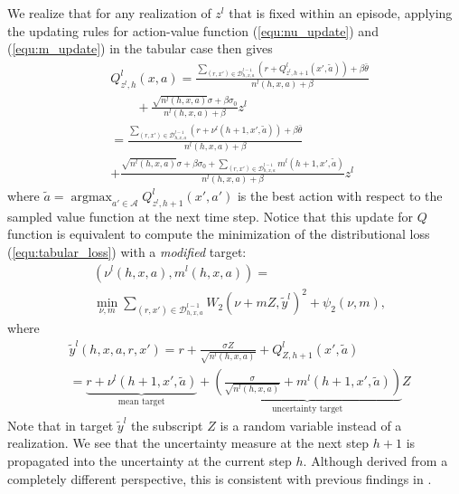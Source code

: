 \documentclass[letterpaper]{article} %
\newcommand{\Sp}[1]{\left(#1\right)}
\DeclareMathOperator*{\argmax}{argmax}
\theoremstyle{definition}
\begin{document}
We realize that for any realization of $z^l$ that is fixed within an episode, applying the updating rules for action-value function (\ref{equ:nu_update}) and (\ref{equ:m_update}) in the tabular case then gives
\fontsize{9}{9}
\begin{align*}
    &Q^l_{z^l, h}\Sp{x, a}=\frac{\sum_{\Sp{r, x'}\in\mathcal{D}^{l-1}_{h, x, a}}\Sp{r+Q_{z^l, h+1}^l\Sp{x', \tilde{a}}}+\beta\bar{\theta}}{n^l\Sp{h, x, a}+\beta}\\
    &\qquad+\frac{\sqrt{n^l\Sp{h, x, a}}\sigma+\beta\sigma_0}{n^l\Sp{h, x, a}+\beta}z^l\\
    &=\frac{\sum_{\Sp{r, x'}\in\mathcal{D}^{l-1}_{h, x, a}}\Sp{r+\nu^l\Sp{h+1, x', \tilde{a}}}+\beta\bar{\theta}}{n^l\Sp{h, x, a}+\beta}\\
    &+\frac{\sqrt{n^l\Sp{h, x, a}}\sigma+\beta\sigma_0+\sum_{\Sp{r, x'}\in\mathcal{D}^{l-1}_{h, x, a}}m^l\Sp{h+1, x', \tilde{a}}}{n^l\Sp{h, x, a}+\beta}z^l
\end{align*}
\normalsize
where $\tilde{a}=\argmax_{a'\in\mathcal{A}}Q^l_{z^l, h+1}\Sp{x', a'}$ is the best action with respect to the sampled value function at the next time step. Notice that this update for $Q$ function is equivalent to compute the minimization of the distributional loss (\ref{equ:tabular_loss}) with a \emph{modified} target:
\begin{align*}
     &\Sp{\nu^l\Sp{h, x, a}, m^l\Sp{h, x, a}} = \\
    &\min_{\nu, m} \sum_{\Sp{r, x'}\in\mathcal{D}^{l-1}_{h, x, a}} W_2\Sp{\nu + mZ, \tilde{y}^l}^2 + \psi_2\Sp{\nu, m},
\end{align*}
where
\fontsize{9}{9}
\begin{align*}
& \tilde{y}^l\Sp{h, x, a, r, x'} = r+\frac{\sigma Z}{\sqrt{n^l\Sp{h, x, a}}}+Q^l_{Z, h+1}\Sp{x', \tilde{a}} \\
& = \underbrace{r+ \nu^l(h+1, x', \tilde{a})}_{\text{mean target}} + \underbrace{(\frac{\sigma}{\sqrt{n^l\Sp{h, x, a}}}+ m^l(h+1, x', \tilde{a}))}_{\text{uncertainty target}}Z
\end{align*}
\normalsize
Note that in target $\tilde{y}^l$ the subscript $Z$ is a random variable instead of a realization. We see that the uncertainty measure at the next step $h+1$ is propagated into the uncertainty at the current step $h$. Although derived from a completely different perspective, this is consistent with previous findings in \cite{o2017uncertainty}.
\end{document}
